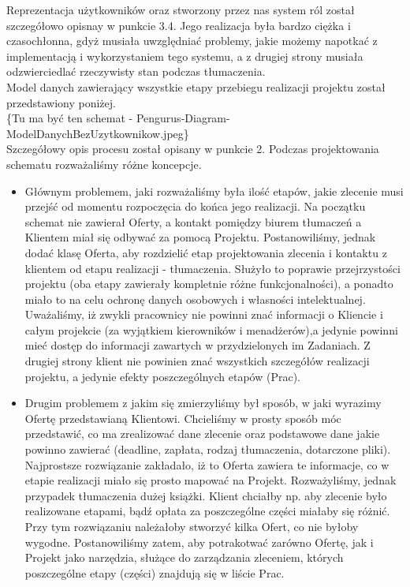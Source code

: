 \documentclass[licencjacka]{pracamgr}
\begin{document}
Reprezentacja użytkowników oraz stworzony przez nas system ról został szczegółowo opisnay w punkcie 3.4. 
Jego realizacja była bardzo ciężka i czasochłonna, gdyż musiała uwzględniać problemy, jakie możemy napotkać z implementacją i wykorzystaniem tego systemu, 
a z drugiej strony musiała odzwierciedlać rzeczywisty stan podczas tłumaczenia.\\


Model danych zawierający wszystkie etapy przebiegu realizacji projektu został przedstawiony poniżej.\\
\{Tu ma być ten schemat - Pengurus-Diagram-ModelDanychBezUzytkownikow.jpeg\} \\
Szczegółowy opis procesu został opisany w punkcie 2. Podczas projektowania schematu rozważaliśmy różne koncepcje.
\begin{itemize}
\item Głównym problemem, jaki rozważaliśmy była ilość etapów, jakie zlecenie musi przejść od momentu rozpoczęcia do końca jego realizacji. 
Na początku schemat nie zawierał Oferty, a kontakt pomiędzy biurem tłumaczeń a Klientem miał się odbywać za pomocą Projektu. 
Postanowiliśmy, jednak dodać klasę Oferta, aby rozdzielić etap projektowania zlecenia i kontaktu z klientem od etapu realizacji - tłumaczenia. 
Służyło to poprawie przejrzystości projektu (oba etapy zawierały kompletnie różne funkcjonalności), a ponadto miało to na celu ochronę danych osobowych i własności intelektualnej.
Uważaliśmy, iż zwykli pracownicy nie powinni znać informacji o Kliencie i całym projekcie (za wyjątkiem kierowników i menadżerów),a jedynie powinni mieć dostęp do informacji zawartych w przydzielonych im Zadaniach.
 Z drugiej strony klient nie powinien znać wszystkich szczegółów realizacji projektu, a jedynie efekty poszczególnych etapów (Prac).
\item Drugim problemem z jakim się zmierzyliśmy był sposób, w jaki wyrazimy Ofertę przedstawianą Klientowi.
Chcieliśmy w prosty sposób móc przedstawić, co ma zrealizować dane zlecenie oraz podstawowe dane jakie powinno zawierać (deadline, zapłata, rodzaj tłumaczenia, dotarczone pliki).
Najprostsze rozwiązanie zakładało, iż to Oferta zawiera te informacje, co w etapie realizacji miało się prosto mapować na Projekt.
Rozważyliśmy, jednak przypadek tłumaczenia dużej książki. Klient chciałby np. aby zlecenie było realizowane etapami, bądź opłata za poszczególne części miałaby się różnić.
Przy tym rozwiązaniu należałoby stworzyć kilka Ofert, co nie byłoby wygodne. 
Postanowiliśmy zatem, aby potrakotwać zarówno Ofertę, jak i Projekt jako narzędzia, służące do zarządzania zleceniem, których poszczególne etapy (części) znajdują się w liście Prac.

\end{itemize}
\end{document}
